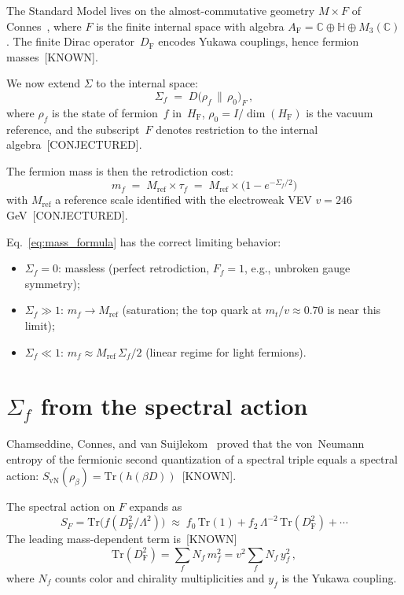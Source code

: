 \documentclass[prl,twocolumn,superscriptaddress,longbibliography]{revtex4-2}
\newcommand{\Tr}{\mathrm{Tr}}
\newcommand{\SvN}{S_{\mathrm{vN}}}
\newcommand{\AF}{A_{\mathrm{F}}}
\newcommand{\DF}{D_{\mathrm{F}}}
\newcommand{\HF}{H_{\mathrm{F}}}
\newcommand{\Mref}{M_{\mathrm{ref}}}
\begin{document}
The Standard Model lives on the
almost-commutative geometry $M \times F$ of
Connes~\cite{CC1996}, where $F$ is the finite
internal space with algebra
$\AF = \mathbb{C} \oplus \mathbb{H}
\oplus M_3(\mathbb{C})$.
The finite Dirac operator~$\DF$ encodes Yukawa
couplings, hence fermion masses~[KNOWN].

We now extend $\Sigma$ to the internal space:
\begin{equation}\label{eq:Sigma_f}
  \Sigma_f \;=\; D\bigl(\rho_f \,\big\|\, \rho_0\bigr)_F\,,
\end{equation}
where $\rho_f$ is the state of fermion~$f$ in~$\HF$,
$\rho_0 = I/\dim(\HF)$ is the vacuum reference, and
the subscript~$F$ denotes restriction to the internal
algebra~[CONJECTURED].

The fermion mass is then the
retrodiction cost:
\begin{equation}\label{eq:mass_formula}
  \boxed{\;
  m_f \;=\; \Mref \times \tau_f
  \;=\; \Mref \times
  \bigl(1 - e^{-\Sigma_f/2}\bigr)
  \;}
\end{equation}
with $\Mref$ a reference scale identified with the
electroweak VEV $v = 246$\,GeV~[CONJECTURED].

Eq.~\eqref{eq:mass_formula} has the correct limiting
behavior:
\begin{itemize}
\item $\Sigma_f = 0$: massless (perfect retrodiction,
  $F_f = 1$, e.g., unbroken gauge symmetry);
\item $\Sigma_f \gg 1$: $m_f \to \Mref$ (saturation;
  the top quark at $m_t/v \approx 0.70$ is near this
  limit);
\item $\Sigma_f \ll 1$: $m_f \approx \Mref\,\Sigma_f/2$
  (linear regime for light fermions).
\end{itemize}


\section{$\Sigma_f$ from the spectral action}
\label{sec:spectral}

Chamseddine, Connes, and van
Suijlekom~\cite{CCSvS2018} proved that the von~Neumann
entropy of the fermionic second quantization of a
spectral triple equals a spectral action:
$\SvN(\rho_\beta) = \Tr(h(\beta D))$~[KNOWN].

The spectral action on $F$ expands as
\begin{equation}\label{eq:SF}
  S_F = \Tr\bigl(f(\DF^2/\Lambda^2)\bigr)
  \;\approx\; f_0\,\Tr(1)
  + f_2\,\Lambda^{-2}\,\Tr(\DF^2) + \cdots
\end{equation}
The leading mass-dependent term is~[KNOWN]
\begin{equation}\label{eq:TrDF2}
  \Tr(\DF^2) = \sum_f N_f\, m_f^2
  = v^2 \sum_f N_f\, y_f^2\,,
\end{equation}
where $N_f$ counts color and chirality
multiplicities and $y_f$ is the Yukawa coupling.
\end{document}
